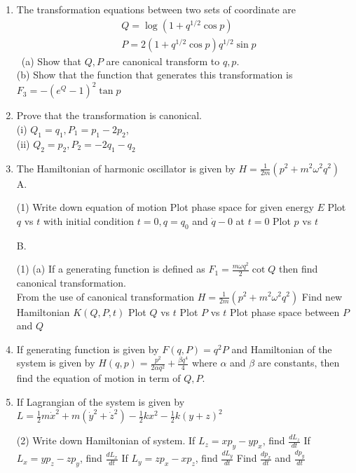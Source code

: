 \begin{enumerate}
	(a) $S_{1}=\frac{1}{2}\left(x p_{y}-y p_{x}\right)$\\
	(b) $S_{2}=\frac{1}{2 m \omega}\left(p_{x} p_{1}+m^{2} \omega^{2} x y\right)$\\
	(c) $S_{3}=\frac{1}{4 m \omega}\left[p_{s}^{2}-p_{3}^{2}+m^{2} \omega^{2}\left(y^{2}-x^{2}\right)\right]$\\
	\item The transformation equations between two sets of coordinate are
	$$
	\begin{aligned}
	&Q=\log \left(1+q^{1 / 2} \cos p\right) \\
	&P=2\left(1+q^{1 / 2} \cos p\right) q^{1 / 2} \sin p
	\end{aligned}
	$$\
	(a) Show that $Q, P$ are canonical transform to $q, p$.\\
	(b) Show that the function that generates this transformation is $F_{3}=-\left(e^{Q}-1\right)^{2} \tan p$
	\item Prove that the transformation is canonical.\\
	(i) $Q_{1}=q_{1}, P_{1}=p_{1}-2 p_{2}$,\\
	(ii) $Q_{2}=p_{2}, P_{2}=-2 q_{1}-q_{2}$
	\item  The Hamiltonian of harmonic oscillator is given by $H=\frac{1}{2 m}\left(p^{2}+m^{2} \omega^{2} q^{2}\right)$\\
 	A. \begin{tasks}(1)
		\task[\textbf{a.}]Write down equation of motion
		\task[\textbf{b.}]Plot phase space for given energy $E$
		\task[\textbf{c.}] Plot $q$ vs $t$ with initial condition $t=0, q=q_{0}$ and $\dot{q}-0$ at $t=0$
		\task[\textbf{d.}] Plot $p$ vs $t$
	\end{tasks}
	B.	 \begin{tasks}(1)
		\task[\textbf{a.}] (a) If a generating function is defined as $F_{1}=\frac{m \omega q^{2}}{2} \cot Q$ then find canonical transformation.\\
		From the use of canonical transformation $H=\frac{1}{2 m}\left(p^{2}+m^{2} \omega^{2} q^{2}\right)$
		\task[\textbf{b.}]Find new Hamiltonian $K(Q, P, t)$
		\task[\textbf{c.}]Plot $Q$ vs $t$
		\task[\textbf{d.}]Plot $P$ vs $t$
		\task[\textbf{e.}]Plot phase space between $P$ and $Q$
	\end{tasks}
\item If generating function is given by $F(q, P)=q^{2} P$ and Hamiltonian of the system is given by $H(q, p)=\frac{p^{2}}{2 \alpha q^{2}}+\frac{\beta q^{4}}{4}$ where $\alpha$ and $\beta$ are constants, then find the equation of motion in term of $Q, P$.
\item If Lagrangian of the system is given by $L=\frac{1}{2} m \dot{x}^{2}+m\left(\dot{y}^{2}+\dot{z}^{2}\right)-\frac{1}{2} k x^{2}-\frac{1}{2} k(y+z)^{2}$
 \begin{tasks}(2)
	\task[\textbf{a.}]Write down Hamiltonian of system.
	\task[\textbf{b.}]If $L_{z}=x p_{y}-y p_{x}$, find $\frac{d L_{z}}{d t}$
	\task[\textbf{c.}]If $L_{x}=y p_{z}-z p_{y}$, find $\frac{d L_{x}}{d t}$
	\task[\textbf{d.}] If $L_{y}=z p_{x}-x p_{z}$, find $\frac{d L_{y}}{d t}$
	\task[\textbf{e.}]Find $\frac{d p_{x}}{d t}$ and $\frac{d p_{y}}{d t}$
\end{tasks}
	

\end{enumerate}
